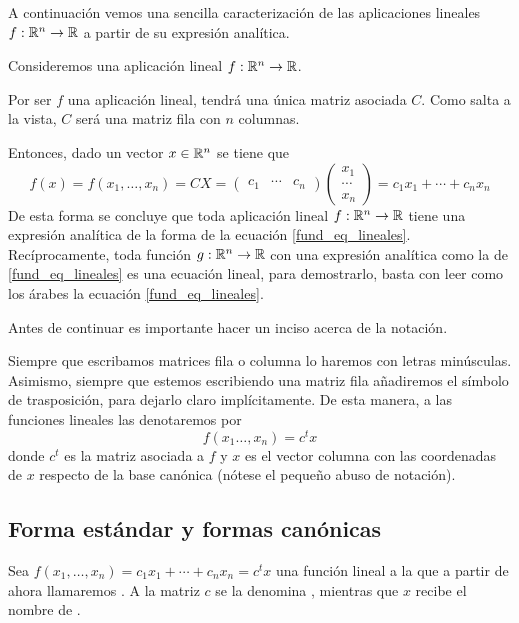 A continuación vemos una sencilla caracterización de las aplicaciones lineales $f:\mathbb{R}^n\to\mathbb{R}$ a partir de su expresión analítica.
\begin{obs}
	Consideremos una aplicación lineal $f:\mathbb{R}^n\to\mathbb{R}$.
	
	Por ser $f$ una aplicación lineal, tendrá una única matriz asociada $C$. Como salta a la vista, $C$ será una matriz fila con $n$ columnas.
	
	Entonces, dado un vector $x\in\mathbb{R}^n$ se tiene que
	\begin{equation}
	\label{fund_eq_lineales}
	f(x)=f(x_1,\dots,x_n)= CX=\begin{pmatrix}
	c_1 & \cdots & c_n
	\end{pmatrix}\begin{pmatrix}
	x_1\\ \cdots \\x_n
	\end{pmatrix}=c_1x_1+\cdots+c_nx_n
	\end{equation}
	De esta forma se concluye que toda aplicación lineal $f:\mathbb{R}^n\to\mathbb{R}$ tiene una expresión analítica de la forma de la ecuación \eqref{fund_eq_lineales}. Recíprocamente, toda función $g:\mathbb{R}^n\to\mathbb{R}$ con una expresión analítica como la de \eqref{fund_eq_lineales} es una ecuación lineal, para demostrarlo, basta con leer como los árabes la ecuación \eqref{fund_eq_lineales}.
\end{obs}
Antes de continuar es importante hacer un inciso acerca de la notación.
\begin{obs}
	Siempre que escribamos matrices fila o columna lo haremos con letras minúsculas. Asimismo, siempre que estemos escribiendo una matriz fila añadiremos el símbolo de trasposición, para dejarlo claro implícitamente. De esta manera, a las funciones lineales las denotaremos por
	\begin{equation*}
		f(x_1\dots,x_n)=c^tx
	\end{equation*}
	donde $c^t$ es la matriz asociada a $f$ y $x$ es el vector columna con las coordenadas de $x$ respecto de la base canónica (nótese el pequeño abuso de notación).
\end{obs}
\subsection{Forma estándar y formas canónicas}

Sea $f(x_1,\dots,x_n)=c_1x_1+\cdots+c_nx_n=c^tx$ una función lineal  a la que a partir de ahora llamaremos . A la matriz $c$ se la denomina , mientras que $x$ recibe el nombre de .

